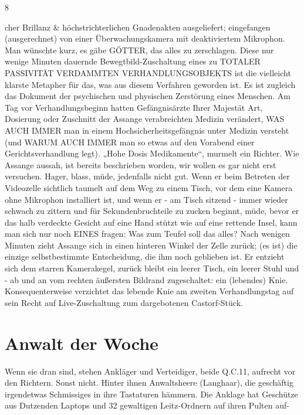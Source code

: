 \begin{multicols}{2}
8

cher Brillanz \& höchstrichterlichen Gnadenakten ausgeliefert; eingefangen (ausgerechnet) von einer Überwachungskamera mit deaktiviertem Mikrophon.
Man wünschte kurz, es gäbe GÖTTER, das alles zu zerschlagen.
Diese nur wenige Minuten dauernde Bewegtbild-Zuschaltung eines zu TOTALER PASSIVITÄT VERDAMMTEN VERHANDLUNGSOBJEKTS ist die vielleicht klarste
Metapher für das, was aus diesem Verfahren geworden
ist.
Es ist zugleich das Dokument der psychischen und physischen Zerstörung eines Menschen. Am Tag vor Verhandlungsbeginn hatten Gefängnisärzte Ihrer Majestät
Art, Dosierung oder Zuschnitt der Assange verabreichten
Medizin verändert, WAS AUCH IMMER man in einem
Hochsicherheitsgefängnis unter Medizin versteht (und
WARUM AUCH IMMER man so etwas auf den Vorabend
einer Gerichtsverhandlung legt). „Hohe Dosis Medikamente“, murmelt ein Richter. Wie Assange aussah, ist
bereits beschrieben worden, wir wollen es gar nicht erst
versuchen. Hager, blass, müde, jedenfalls nicht gut.
Wenn er beim Betreten der Videozelle sichtlich taumelt auf dem Weg zu einem Tisch, vor dem eine Kamera ohne
Mikrophon installiert ist, und wenn er - am Tisch sitzend
- immer wieder schwach zu zittern und für Sekundenbruchteile zu zucken beginnt, müde, bevor er das halb
verdeckte Gesicht auf eine Hand stützt wie auf eine rettende Insel, kann man sich nur noch EINES fragen: Was
zum Teufel soll das alles?
Nach wenigen Minuten zieht Assange sich in einen hinteren Winkel der Zelle zurück; (es ist) die einzige selbstbestimmte Entscheidung, die ihm noch geblieben ist. Er
entzieht sich dem starren Kamerakegel, zurück bleibt
ein leerer Tisch, ein leerer Stuhl und - ab und an vom
rechten äußersten Bildrand zugeschaltet: ein (lebendes)
Knie.
Konsequenterweise verzichtet das lebende Knie am
zweiten Verhandlungstag auf sein Recht auf Live-Zuschaltung zum dargebotenen Castorf-Stück.


\chapter{Anwalt der Woche}
Wenn sie dran sind, stehen Ankläger und Verteidiger,
beide Q.C.11, aufrecht vor den Richtern. Sonst nicht.
Hinter ihnen Anwaltsheere (Langhaar), die geschäftig irgendetwas Schmissiges in ihre Tastaturen hämmern.
Die Anklage hat Geschütze aus Dutzenden Laptops
und 32 gewaltigen Leitz-Ordnern auf ihren Pulten auf-


\end{multicols}
